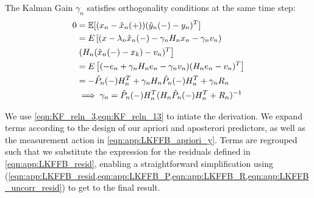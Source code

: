 The Kalman Gain $\gamma_n$ satisfies orthogonality conditions at the same time step:
\begin{align}
0 &= \mathbb{E}[(x_n - \hat{x}_{n}(+))(\hat{y}_n(-) - y_n)^T] \\ 
& = E \left[ (x -\lambda_n \hat{x}_{n}(-) - \gamma_n H_n x_n - \gamma_n v_n) \right. \\
& \left. (H_n (\hat{x}_{n}(-) - x_{k}) -v_n)^T\right]  \label{eqn:app:LKFFB_apriori_y}\\
&= E\left[(-e_n + \gamma_n H_ne_n - \gamma_n v_n)(H_n e_n -v_n)^T\right]  \\
&= -\hat{P}_{n}(-) H_n^T+ \gamma_n H_n\hat{P}_{n}(-)H_n^T + \gamma_n R_n \\
& \implies \gamma_n = \hat{P}_{n}(-) H_n^T(H_n\hat{P}_{n}(-)H_n^T + R_n)^{-1} \label{eqn:KF_update_gamma}
\end{align} 

We use \cref{eqn:KF_reln_3,eqn:KF_reln_13} to intiate the derivation. We expand terms according to the design of our apriori and aposterori predictors, as well as the measurement action in \cref{eqn:app:LKFFB_apriori_y}. Terms are regrouped such that we substitute the expression for the residuals defined in \cref{eqn:app:LKFFB_resid}, enabling a straightforward simplification using (\cref{eqn:app:LKFFB_resid,eqn:app:LKFFB_P,eqn:app:LKFFB_R,eqn:app:LKFFB_uncorr_resid}) to get to the final result. 

